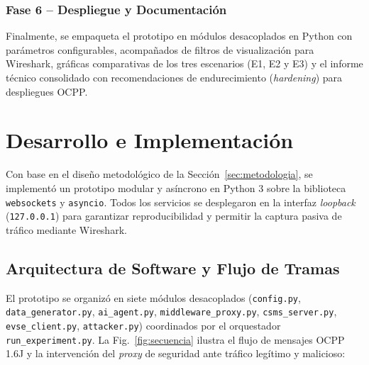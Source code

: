 \documentclass[conference]{IEEEtran}
\begin{document}
\subsubsection{Fase 6 -- Despliegue y Documentación}
Finalmente, se empaqueta el prototipo en módulos desacoplados en Python con parámetros configurables, acompañados de filtros de visualización para Wireshark, gráficas comparativas de los tres escenarios (E1, E2 y E3) y el informe técnico consolidado con recomendaciones de endurecimiento (\textit{hardening}) para despliegues OCPP.

\FloatBarrier
\section{Desarrollo e Implementación}
\label{sec:desarrollo}

Con base en el diseño metodológico de la Sección~\ref{sec:metodologia}, se implementó un prototipo modular y asíncrono en Python 3 sobre la biblioteca \texttt{websockets} y \texttt{asyncio}. Todos los servicios se desplegaron en la interfaz \textit{loopback} (\texttt{127.0.0.1}) para garantizar reproducibilidad y permitir la captura pasiva de tráfico mediante Wireshark.

\subsection{Arquitectura de Software y Flujo de Tramas}

El prototipo se organizó en siete módulos desacoplados (\texttt{config.py}, \texttt{data\_generator.py}, \texttt{ai\_agent.py}, \texttt{middleware\_proxy.py}, \texttt{csms\_server.py}, \texttt{evse\_client.py}, \texttt{attacker.py}) coordinados por el orquestador \texttt{run\_experiment.py}. La Fig.~\ref{fig:secuencia} ilustra el flujo de mensajes OCPP 1.6J y la intervención del \textit{proxy} de seguridad ante tráfico legítimo y malicioso:
\end{document}
